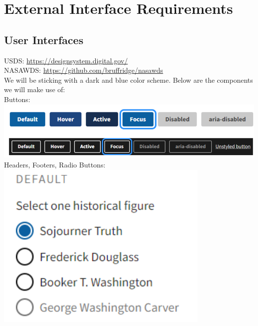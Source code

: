 \documentclass{article}
\begin{document}
\section{External Interface Requirements}

\subsection{User Interfaces}
USDS: \href{https://designsystem.digital.gov/}{https://designsystem.digital.gov/} \\
NASAWDS: \href{https://github.com/bruffridge/nasawds}{https://github.com/bruffridge/nasawds} \\
We will be sticking with a dark and blue color scheme. Below are the components we will make use of: \\
Buttons: \\
\includegraphics{buttons} \\
Headers, Footers, Radio Buttons: \\
\includegraphics{headers} \\
\end{document}
